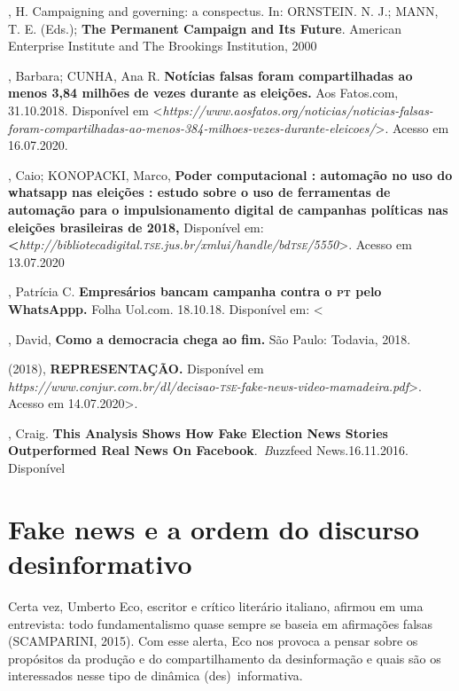 \begin{bibliohedra}
, H. Campaigning and governing: a conspectus. In: ORNSTEIN. N. J.;
MANN, T. E. (Eds.); \textbf{The Permanent Campaign and Its Future}.
American Enterprise Institute and The Brookings Institution, 2000

, Barbara; CUNHA, Ana R. \textbf{Notícias falsas foram
compartilhadas ao menos 3,84 milhões de vezes durante as eleições.} Aos
Fatos.com, 31.10.2018. Disponível em
\textless{}\textit{https://www.aosfatos.org/noticias/noticias-falsas-foram-compartilhadas-ao-menos-384-milhoes-vezes-durante-eleicoes/}\textgreater{}.
Acesso em 16.07.2020.

, Caio; KONOPACKI, Marco, \textbf{Poder computacional : automação
no uso do whatsapp nas eleições : estudo sobre o uso de ferramentas de
automação para o impulsionamento digital de campanhas políticas nas
eleições brasileiras de 2018,} Disponível em:
\textbf{\textless{}}\textit{http://bibliotecadigital.\textsc{tse}.jus.br/xmlui/handle/bd\textsc{tse}/5550}\textgreater{}.
Acesso em 13.07.2020

, Patrícia C. \textbf{Empresários bancam campanha contra o \textsc{pt} pelo
WhatsAppp.} Folha Uol.com. 18.10.18. Disponível em: \textless{}

, David, \textbf{Como a democracia chega ao fim.} São Paulo:
Todavia, 2018.

 (2018), \textbf{REPRESENTAÇÃO.} Disponível
em
\textit{https://www.conjur.com.br/dl/decisao-\textsc{tse}-fake-news-video-mamadeira.pdf}\textgreater{}.
Acesso em 14.07.2020\textgreater{}.

, Craig. \textbf{This Analysis Shows How Fake Election News
Stories Outperformed Real News On Facebook}.~\textit{B}uzzfeed
News.16.11.2016. Disponível
\end{bibliohedra}

\chapter{Fake news e a ordem do discurso\\desinformativo}


Certa vez, Umberto Eco, escritor e crítico literário italiano, afirmou
em uma entrevista: todo fundamentalismo quase sempre se baseia em
afirmações falsas (SCAMPARINI, 2015). Com esse alerta, Eco nos provoca a
pensar sobre os propósitos da produção e do compartilhamento da
desinformação e quais são os interessados nesse tipo de dinâmica (des)~informativa.

